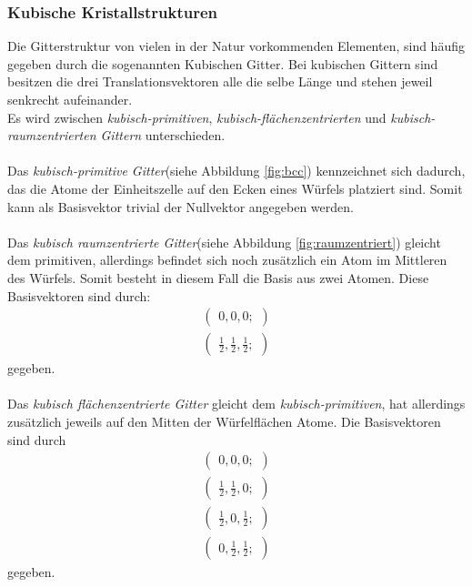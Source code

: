 \subsubsection{Kubische Kristallstrukturen}
\label{subsubsec:kubische_gitter}

Die Gitterstruktur von vielen in der Natur vorkommenden Elementen,
sind häufig gegeben durch die sogenannten Kubischen Gitter.
Bei kubischen Gittern sind besitzen die drei Translationsvektoren
alle die selbe Länge und stehen jeweil senkrecht aufeinander.\\
Es wird zwischen \textit{kubisch-primitiven},
\textit{kubisch-flächenzentrierten} und
\textit{kubisch-raumzentrierten Gittern} unterschieden. \\ \\
Das \textit{kubisch-primitive Gitter}(siehe Abbildung \ref{fig:bcc})
kennzeichnet sich dadurch,
das die Atome der Einheitszelle auf den Ecken
eines Würfels platziert sind. Somit kann als Basisvektor trivial
der Nullvektor angegeben werden.\\ \\
Das \textit{kubisch raumzentrierte Gitter}(siehe Abbildung \ref{fig:raumzentriert})
gleicht dem primitiven, allerdings befindet sich noch
zusätzlich ein Atom im Mittleren des Würfels.
Somit besteht in diesem Fall die Basis aus zwei Atomen.
Diese Basisvektoren sind durch:
\begin{align}
  \label{eqn:2}
  \begin{pmatrix}
    0, 0, 0;
  \end{pmatrix}\\
  \begin{pmatrix}
    \frac{1}{2}, \frac{1}{2}, \frac{1}{2};
  \end{pmatrix}
\end{align}
gegeben.\\ \\
Das \textit{kubisch flächenzentrierte Gitter} gleicht dem
\textit{kubisch-primitiven}, hat
allerdings zusätzlich jeweils auf den Mitten der Würfelflächen Atome.
Die Basisvektoren sind durch
\begin{align}
   \label{eqn:3}
   \begin{pmatrix}
     0, 0, 0;
   \end{pmatrix}\\
   \begin{pmatrix}
     \frac{1}{2}, \frac{1}{2}, 0;
   \end{pmatrix}\\
   \begin{pmatrix}
     \frac{1}{2}, 0, \frac{1}{2};
     \end{pmatrix}\\
     \begin{pmatrix}
       0, \frac{1}{2}, \frac{1}{2};
     \end{pmatrix}
\end{align}
gegeben.

